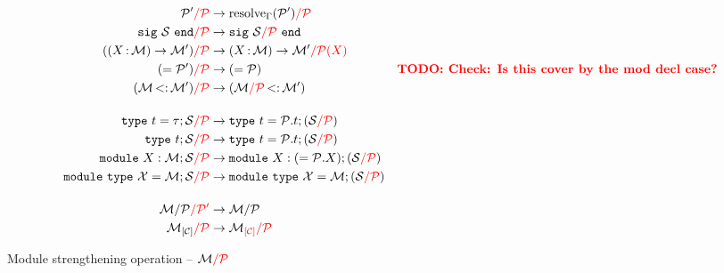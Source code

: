 \begin{align*}
  \Ostrengthen{l}{\iP}{\iP'}
  &\to \Ostrengthen{l}{\iP}{\resolve{\E}{\iP'}}\\
  \Ostrengthen{l}{\iP}{\Ssig{\iS}}
  &\to \Ssig{\Ostrengthen{l}{\iP}{\iS}}\\
  \Ostrengthen{l}{\iP}{(\Sfunctor{\ix}{\iM}{\iM'})}
  &\to \Sfunctor{\ix}{\iM}{\Ostrengthen{l}{\iP(X)}{\iM'}}\\
  \Ostrengthen{l}{\iP}{\Salias{\iP'}}
  &\to \Salias{\iP} &\TODO{Check: Is this cover by the mod decl case?}\\
  \Ostrengthen{l}{\iP}{\Stransp{\iM}{\iM'}}
  &\to \Stransp{\Ostrengthen{l}{\iP}{\iM}}{\iM'}\\[4mm]
  \Ostrengthen{l}{\iP}{\Stype{t}{\tau};\iS}
  &\to \Stype{t}{\iP.t};(\Ostrengthen{l}{\iP}{\iS}) %
  \\
  \Ostrengthen{l}{\iP}{\Stypeabs{t};\iS}
  &\to \Stype{t}{\iP.t};(\Ostrengthen{l}{\iP}{\iS}) %
  \\
  \Ostrengthen{l}{\iP}{\Smodulety{\ix}{\iM};\iS}
  &\to \Smodulety{\ix}{\Salias{\iP.\ix}};
    (\Ostrengthen{l}{\iP}{\iS}) %
  \\
  \Ostrengthen{l}{\iP}{\Smoduletype{\iX}{\iM};\iS}
  &\to \Smoduletype{\iX}{\iM};
    (\Ostrengthen{l}{\iP}{\iS}) \\[4mm]
  \Ostrengthen{l'}{\iP'}{\Sstrengthen{l}{\iP}{\iM}}
  &\to \Sstrengthen{l}{\iP}{\iM}\\
  \Ostrengthen{l}{\iP}{\Senrich{\iC}{\iM}}
  &\to \Ostrengthen{l}{\iP}{\Oenrich{\iC}{\iM}}\\
\end{align*}\vspace{-3mm}
\caption{Module strengthening operation -- $\Ostrengthen{l}{\iP}{\iM}$}
\label{module:strengthen}

